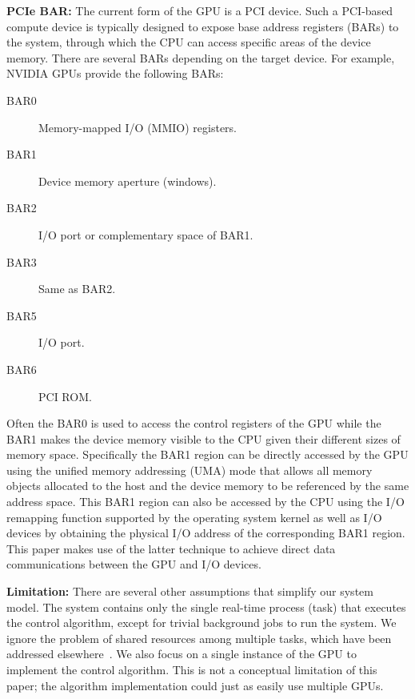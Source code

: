 \textbf{PCIe BAR:}
The current form of the GPU is a PCI device.
Such a PCI-based compute device is typically designed to expose base
address registers (BARs) to the system, through which the CPU can access
specific areas of the device memory.
There are several BARs depending on the target device.
For example, NVIDIA GPUs provide the following BARs:
\begin{description}
 \item[BAR0] Memory-mapped I/O (MMIO) registers.
 \item[BAR1] Device memory aperture (windows).
 \item[BAR2] I/O port or complementary space of BAR1.
 \item[BAR3] Same as BAR2.
 \item[BAR5] I/O port.
 \item[BAR6] PCI ROM.
\end{description}
Often the BAR0 is used to access the control registers of the GPU while
the BAR1 makes the device memory visible to the CPU given their
different sizes of memory space.
Specifically the BAR1 region can be directly accessed by the GPU using
the unified memory addressing (UMA) mode that allows all memory objects
allocated to the host and the device memory to be referenced by the same
address space.
This BAR1 region can also be accessed by the CPU using the I/O remapping
function supported by the operating system kernel as well as I/O devices
by obtaining the physical I/O address of the corresponding BAR1 region.
This paper makes use of the latter technique to achieve direct data
communications between the GPU and I/O devices.

\textbf{Limitation:}
There are several other assumptions that simplify our system model.
The system contains only the single real-time process (task) that
executes the control algorithm, except for trivial background jobs to
run the system.
We ignore the problem of shared resources among multiple tasks, which
have been addressed elsewhere~\cite{Elliott_RTS12, Kato_RTAS11}.
We also focus on a single instance of the GPU to implement the control
algorithm.
This is not a conceptual limitation of this paper; the algorithm
implementation could just as easily use multiple GPUs.
